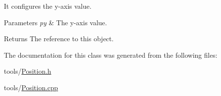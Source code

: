 It configures the y-\/axis value. 


\begin{DoxyParams}{Parameters}
{\em py} & The y-\/axis value. \\
\hline
\end{DoxyParams}
\begin{DoxyReturn}{Returns}
The reference to this object. 
\end{DoxyReturn}


The documentation for this class was generated from the following files\+:\begin{DoxyCompactItemize}
\item 
tools/\hyperlink{_position_8h}{Position.\+h}\item 
tools/\hyperlink{_position_8cpp}{Position.\+cpp}\end{DoxyCompactItemize}
